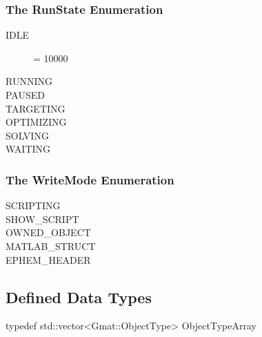 \subsubsection{The RunState Enumeration}

\begin{description}
\item[IDLE] = 10000
\item[RUNNING]
\item[PAUSED]
\item[TARGETING]
\item[OPTIMIZING]
\item[SOLVING]
\item[WAITING]
\end{description}


\subsubsection{The WriteMode Enumeration}

\begin{description}
\item[SCRIPTING]
\item[SHOW\_SCRIPT]
\item[OWNED\_OBJECT]
\item[MATLAB\_STRUCT]
\item[EPHEM\_HEADER]
\end{description}


\subsection{Defined Data Types}

\begin{description}
\item[typedef std::vector<Gmat::ObjectType> ObjectTypeArray]
\end{description}
